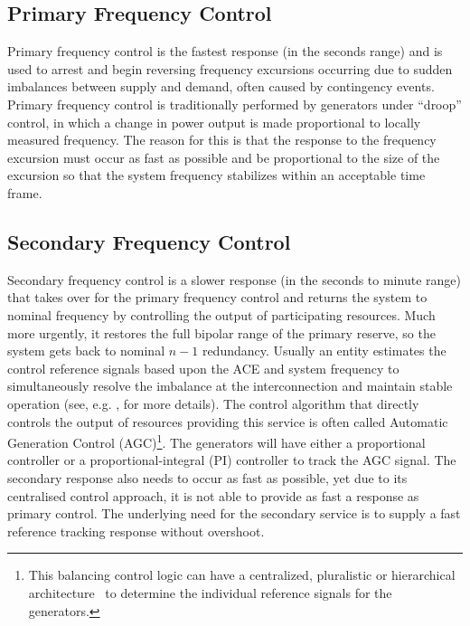 \subsection*{Primary Frequency Control}
Primary frequency control is the fastest response (in the seconds range) and is used to arrest and begin reversing frequency excursions occurring due to sudden imbalances between supply and demand, often caused by contingency events. Primary frequency control is traditionally performed by generators under ``droop'' control, in which a  change in power output is made proportional to locally measured frequency. The reason for this is that the response to the frequency excursion must occur as fast as possible and be proportional to the size of the excursion so that the system frequency stabilizes within an acceptable time frame.
\subsection*{Secondary Frequency Control}
Secondary frequency control is a slower response (in the seconds to minute range) that takes over for the primary frequency control and returns the system to nominal frequency by controlling the output of participating resources. Much more urgently, it restores the full bipolar range of the primary reserve, so the system gets back to nominal $n-1$ redundancy. Usually an entity estimates the control reference signals based upon the ACE and system frequency to simultaneously resolve the imbalance at the interconnection and maintain stable operation (see, e.g. \cite{nerc2011balancing,entsoe2014continental}, for more details). The control algorithm that directly controls the output of resources providing this service is often called Automatic Generation Control (AGC)\footnote{This balancing control logic can have a centralized, pluralistic or hierarchical architecture~\cite{entsoe2014continental} to determine the individual reference signals for the generators.}. The generators will have either a proportional controller or a proportional-integral (PI) controller to track the AGC signal. The secondary response also needs to occur as fast as possible, yet due to its centralised control approach, it is not able to provide as fast a response as primary control. The underlying need for the secondary service is to supply a fast reference tracking response without overshoot.



